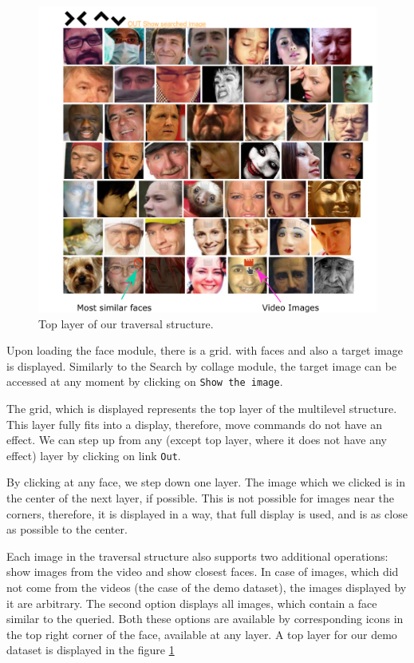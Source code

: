\begin{figure}
    \centering
    \includegraphics[width=\linewidth]{img/face_grid.png}
    \caption{Top layer of our traversal structure.}
    \label{fig:face_grid_app}
\end{figure}

Upon loading the face module, there is a grid. with faces and also a target image is displayed. Similarly to the Search by collage module, the target image can be accessed at any moment by clicking on \verb+Show the image+. 

The grid, which is displayed represents the top layer of the multilevel structure. This layer fully fits into a display, therefore, move commands do not have an effect. We can step up from any (except top layer, where it does not have any effect) layer by clicking on link \verb+Out+.

By clicking at any face, we step down one layer. The image which we clicked is in the center of the next layer, if possible. This is not possible for images near the corners, therefore, it is displayed in a way, that full display is used, and is as close as possible to the center.

Each image in the traversal structure also supports two additional operations: show images from the video and show closest faces. In case of images, which did not come from the videos (the case of the demo dataset), the images displayed by it are arbitrary. The second option displays all images, which contain a face similar to the queried. Both these options are available by corresponding icons in the top right corner of the face, available at any layer. A top layer for our demo dataset is displayed in the figure \ref{fig:face_grid_app}










